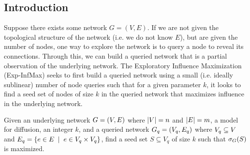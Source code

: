 \begin{comment}
The main contribution of this paper is to extend the idea of Reverse Reachable (RR) sets to this new setting. If we denote 
$\calG_i = G_v \cup G_i$ for an unobserved realization $i$ and $S$ a seed set, then we can define some unbiased estimator of $\infl{S}$ based on the weighted average of the proportion 
of random RR sets generated for each $\calG_i$ that overlap with $S$. We want this estimator to be close enough to $\infl{S}$ so that a simple greedy algorithm that iteratively adds nodes 
chooses a seed set within an acceptable range with high probability. This can be accomplished in two steps 
\begin{enumerate}
    \item Choosing enough RR sets such that for an optimal seed set $S^{\ast}$, the estimator of $\infl{S^*}$ is close with high probability
    \item Choosing more RR sets (if needed) to ensure that the influence estimators of suboptimal seed sets will also be close to their expected vale. 
\end{enumerate}

The paper gives lower bounds on the number of RR sets needed to be chosen for each graph realization $\calG_i$ such that the greedy 
algorithm gives a $\lrp{1 - \frac{1}{e} - \varepsilon}$ approximation with high probability.  
\end{comment}


\newpage
\subsection{Introduction}
Suppose there exists some network $G = (V, E)$. If we are not given the topological structure of the network (i.e.\! we do not know $E$), 
but are given the number of nodes, one way to explore the network is to query a node to reveal its connections. Through this, we can 
build a queried network that is a partial observation of the underlying network. 
The \textsf{Exploratory Influence Maximization (Exp-InfMax)} seeks to first build a queried network 
using a small (i.e.\! ideally sublinear) number of node queries such that for a given parameter $k$, it looks
to find a seed set of nodes of size $k$ in the queried network that maximizes influence in the 
underlying network. 

\begin{problem}
    Given an underlying network $G = \lrp{V, E}$ where $\abs{V} = n$ and $\abs{E} = m$, a model for diffusion, an integer $k$, 
    and a queried network $G_q = \lrp{V_q, E_q}$ where $V_q \sse V$ and $E_q = \lrc{e \in E \;\mid\; e \in V_q \times V_q} $, find a seed set 
    $S \subseteq V_q$ of size $k$ such that $\f[\sigma_G]{S}$ is maximized. 
    \label{prob:exp-infmax}
\end{problem}

